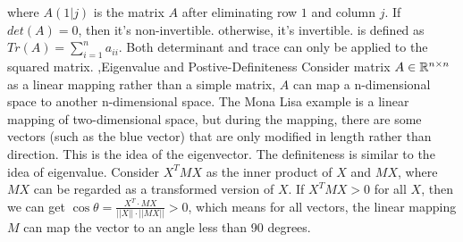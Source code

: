 \documentclass[10pt]{report}
\begin{document}
where $A(1|j)$ is the matrix $A$ after eliminating row $1$ and column $j$. If $det(A)=0$, then it's non-invertible. otherwise, it's invertible.
 is defined as $Tr(A)=\sum_{i=1}^n a_{ii}$. Both determinant and trace can only be applied to the squared matrix.
\sep{Eigenvalue and Postive-Definiteness}
Consider matrix $A\in \RR^{n\times n}$ as a linear mapping rather than a simple matrix, $A$ can map a n-dimensional space to another n-dimensional space.
The Mona Lisa example is a linear mapping of two-dimensional space, but during the mapping, there are some vectors (such as the blue vector) that are only modified in length rather than direction. This is the idea of the eigenvector.
The definiteness is similar to the idea of eigenvalue. Consider $X^T MX$ as the inner product of $X$ and $MX$, where $MX$ can be regarded as a transformed version of $X$. If $X^T MX>0$ for all $X$, then we can get $\cos \theta=\frac{X^T \cdot MX}{||X||\cdot ||MX||}>0$, which means for all vectors, the linear mapping $M$ can map the vector to an angle less than 90 degrees.
\end{document}
